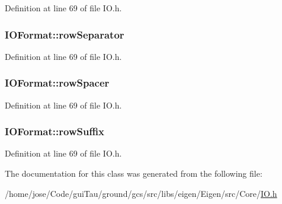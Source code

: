 Definition at line 69 of file I\-O.\-h.

\hypertarget{struct_i_o_format_ac81a4fba783004fe55fab9dbce357a4e}{
\subsubsection[{row\-Separator}]{ I\-O\-Format\-::row\-Separator}}\label{struct_i_o_format_ac81a4fba783004fe55fab9dbce357a4e}


Definition at line 69 of file I\-O.\-h.

\hypertarget{struct_i_o_format_a8cba2479446a22046569fc30a7892439}{
\subsubsection[{row\-Spacer}]{ I\-O\-Format\-::row\-Spacer}}\label{struct_i_o_format_a8cba2479446a22046569fc30a7892439}


Definition at line 69 of file I\-O.\-h.

\hypertarget{struct_i_o_format_ab060e31456bd9f07a388cfae379323a2}{
\subsubsection[{row\-Suffix}]{ I\-O\-Format\-::row\-Suffix}}\label{struct_i_o_format_ab060e31456bd9f07a388cfae379323a2}


Definition at line 69 of file I\-O.\-h.



The documentation for this class was generated from the following file\-:\begin{DoxyCompactItemize}
\item 
/home/jose/\-Code/gui\-Tau/ground/gcs/src/libs/eigen/\-Eigen/src/\-Core/\hyperlink{_i_o_8h}{I\-O.\-h}\end{DoxyCompactItemize}
